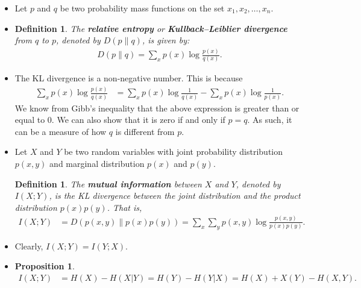 \documentclass[10pt]{article}
\newtheorem{definition}[lemma]{Definition}
\newtheorem{proposition}[lemma]{Proposition}
\begin{document}
  \begin{itemize}
  	\item Let $p$ and $q$ be two probability mass functions on the set ${x_1, x_2, \dotsc, x_n}$. 

  	\item \begin{definition}
  		The \textbf{relative entropy} or \textbf{Kullback--Leiblier divergence} from $q$ to $p$, denoted by $D(p \| q)$, is given by:
  		\begin{align*}
  			D(p \| q) 
  			= \sum_{x} p(x) \log \frac{p(x)}{q(x)}.
  		\end{align*}
  	\end{definition}

  	\item The KL divergence is a non-negative number. This is because
  	\begin{align*}
  		\sum_{x} p(x) \log \frac{p(x)}{q(x)}
  		&= \sum_{x} p(x) \log \frac{1}{q(x)} - \sum_{x} p(x) \log \frac{1}{p(x)}.
  	\end{align*}
  	We know from Gibb's inequality that the above expression is greater than or equal to $0$. We can also show that it is zero if and only if $p = q$. As such, it can be a measure of how $q$ is different from $p$.

  	\item Let $X$ and $Y$ be two random variables with joint probability distribution $p(x,y)$ and marginal distribution $p(x)$ and $p(y)$.

 	\begin{definition}
 		The \textbf{mutual information} between $X$ and $Y$, denoted by $I(X;Y)$, is the KL divergence between the joint distribution and the product distribution $p(x)p(y)$. That is,
 		\begin{align*}
 			I(X;Y) 
 			&= D(p(x,y) \| p(x)p(y))
 			= \sum_x \sum_y p(x,y) \log \frac{p(x,y)}{p(x)p(y)}.
 		\end{align*}
 	\end{definition}

 	\item Clearly, $I(X;Y) = I(Y;X)$.

 	\item \begin{proposition}
 		\begin{align*}
 			I(X;Y) 
 			&= H(X) - H(X|Y) = H(Y) - H(Y|X) = H(X) + X(Y) - H(X,Y). 
 		\end{align*}
 	\end{proposition}


\end{itemize}
\end{document}
